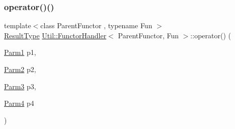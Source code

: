 \mbox{\label{classUtil_1_1FunctorHandler_a2d310b7fe0c60af9889d0ac218406cd9}} 
\subsubsection{\texorpdfstring{operator()()}{operator()()}\hspace{0.1cm}{\footnotesize\ttfamily [14/18]}}
{\footnotesize\ttfamily template$<$class Parent\+Functor , typename Fun $>$ \\
\mbox{\hyperlink{classUtil_1_1FunctorHandler_a036da44b8cc2567704cebd2a20d16c80}{Result\+Type}} \mbox{\hyperlink{classUtil_1_1FunctorHandler}{Util\+::\+Functor\+Handler}}$<$ Parent\+Functor, Fun $>$\+::operator() (\begin{DoxyParamCaption}\item[{\mbox{\hyperlink{classUtil_1_1FunctorHandler_a0a902ba40a0ab746f1c29a81d68ae0db}{Parm1}}}]{p1,  }\item[{\mbox{\hyperlink{classUtil_1_1FunctorHandler_a5fb5374c316f8ac252aa22fcdf7d21a7}{Parm2}}}]{p2,  }\item[{\mbox{\hyperlink{classUtil_1_1FunctorHandler_a25f1b9dd7890c1dbc68abc686f30bec8}{Parm3}}}]{p3,  }\item[{\mbox{\hyperlink{classUtil_1_1FunctorHandler_a2e8ca7556b379684e9b76029e77dd644}{Parm4}}}]{p4 }\end{DoxyParamCaption})\hspace{0.3cm}{\ttfamily [inline]}}

\mbox{\label{classUtil_1_1FunctorHandler_a2d310b7fe0c60af9889d0ac218406cd9}} 

